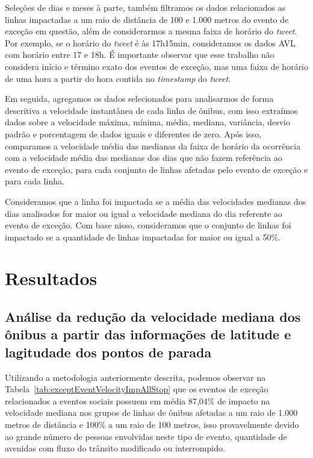 \documentclass[
	12pt,				%
	oneside,			%
	a4paper,			%
	english,			%
	brazil				%
	]{abntex2ppgsi}
\begin{document}
{{{Seleções de dias e meses à parte, também filtramos os dados relacionados as linhas impactadas a um raio de distância de 100 e 1.000 metros do evento de exceção em questão, além de considerarmos a mesma faixa de horário do \textit{tweet}. Por exemplo, se o horário do \textit{tweet} é às 17h15min, consideramos os dados AVL com horário entre 17 e 18h. É importante observar que esse trabalho não considera início e término exato dos eventos de exceção, mas uma faixa de horário de uma hora a partir do hora contida no \textit{timestamp}  do \textit{tweet}.

Em seguida, agregamos os dados selecionados para analisarmos  de forma descritiva a velocidade instantânea de cada linha de ônibus, com isso extraímos dados sobre a velocidade máxima, mínima, média, mediana, variância, desvio padrão e porcentagem de dados iguais e diferentes de zero. Após isso, comparamos a velocidade média das medianas da faixa de horário da ocorrência com a velocidade média das medianas dos dias que não fazem referência ao evento de exceção, para cada conjunto de linhas afetadas pelo evento de exceção e para cada linha.

Consideramos que a linha foi impactada se a média das velocidades medianas dos dias analisados for maior ou igual a velocidade mediana do dia referente ao evento de exceção. Com base nisso, consideramos que o conjunto de linhas foi impactado se a quantidade de linhas impactadas for maior ou igual a 50\%.

\section*{Resultados}

\subsection*{Análise da redução da velocidade mediana dos ônibus a partir das informações de latitude e lagitudade dos pontos de parada}
\label{stopsAnalysis}

Utilizando a metodologia anteriormente descrita, podemos observar na Tabela~\ref{tab:exceptEventVelocityImpAllStop} que os eventos de exceção relacionados a eventos sociais possuem em média 87,04\% de impacto na velocidade mediana nos grupos de linhas de ônibus afetadas a um raio de 1.000 metros de distância e 100\% a um raio de 100 metros, isso provavelmente devido ao grande número de pessoas envolvidas neste tipo de evento, quantidade de avenidas com fluxo do trânsito modificado ou interrompido. 

}}}
\end{document}
